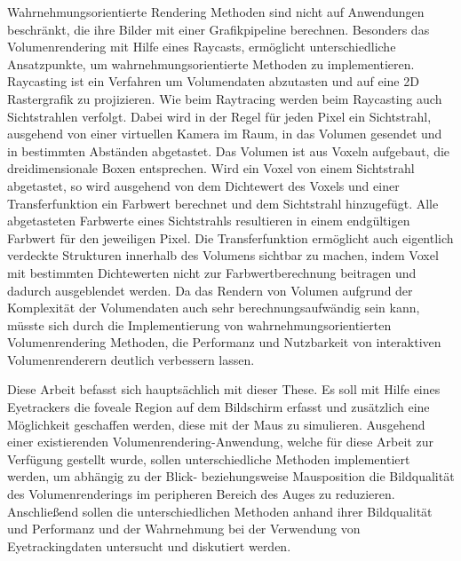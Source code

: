 Wahrnehmungsorientierte Rendering Methoden sind nicht auf Anwendungen beschränkt, die ihre Bilder mit einer Grafikpipeline berechnen.
Besonders das Volumenrendering mit Hilfe eines Raycasts, ermöglicht unterschiedliche Ansatzpunkte, um wahrnehmungsorientierte Methoden zu implementieren.
Raycasting ist ein Verfahren um Volumendaten abzutasten und auf eine 2D Rastergrafik zu projizieren.
Wie beim Raytracing werden beim Raycasting auch Sichtstrahlen verfolgt.
Dabei wird in der Regel für jeden Pixel ein Sichtstrahl, ausgehend von einer virtuellen Kamera im Raum, in das Volumen gesendet und in bestimmten Abständen abgetastet.
Das Volumen ist aus Voxeln aufgebaut, die dreidimensionale Boxen entsprechen.
Wird ein Voxel von einem Sichtstrahl abgetastet, so wird ausgehend von dem Dichtewert des Voxels und einer Transferfunktion ein Farbwert berechnet und dem Sichtstrahl hinzugefügt.
Alle abgetasteten Farbwerte eines Sichtstrahls resultieren in einem endgültigen Farbwert für den jeweiligen Pixel.
Die Transferfunktion ermöglicht auch eigentlich verdeckte Strukturen innerhalb des Volumens sichtbar zu machen, indem Voxel mit bestimmten Dichtewerten nicht zur Farbwertberechnung beitragen und dadurch ausgeblendet werden.
Da das Rendern von Volumen aufgrund der Komplexität der Volumendaten auch sehr berechnungsaufwändig sein kann, müsste sich durch die Implementierung von wahrnehmungsorientierten Volumenrendering Methoden, die Performanz und Nutzbarkeit von interaktiven Volumenrenderern deutlich verbessern lassen.

Diese Arbeit befasst sich hauptsächlich mit dieser These.
Es soll mit Hilfe eines Eyetrackers die foveale Region auf dem Bildschirm erfasst und zusätzlich eine Möglichkeit geschaffen werden, diese mit der Maus zu simulieren.
Ausgehend einer existierenden Volumenrendering-Anwendung, welche für diese Arbeit zur Verfügung gestellt wurde, sollen unterschiedliche Methoden implementiert werden, um abhängig zu der Blick- beziehungsweise Mausposition die Bildqualität des Volumenrenderings im peripheren Bereich des Auges zu reduzieren.
Anschließend sollen die unterschiedlichen Methoden anhand ihrer Bildqualität und Performanz und der Wahrnehmung bei der Verwendung von Eyetrackingdaten untersucht und diskutiert werden.

